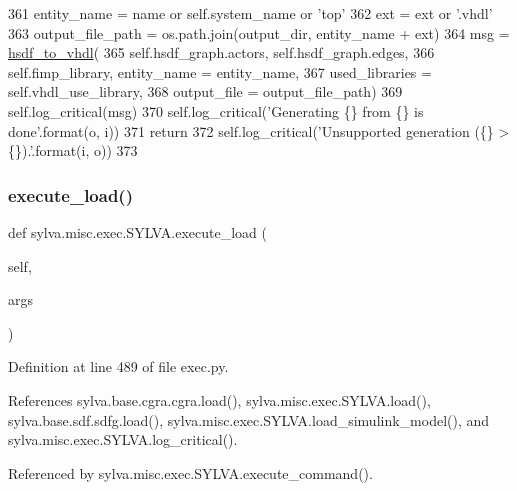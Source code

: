 \begin{DoxyCode}
361       entity\_name = name \textcolor{keywordflow}{or} self.system\_name \textcolor{keywordflow}{or} \textcolor{stringliteral}{'top'}
362       ext = ext \textcolor{keywordflow}{or} \textcolor{stringliteral}{'.vhdl'}
363       output\_file\_path = os.path.join(output\_dir, entity\_name + ext)
364       msg = \hyperlink{namespacesylva_1_1code__generation_1_1hsdf__to__vhdl_a0725288caa57a5c518a1b9c2683291fa}{hsdf\_to\_vhdl}(
365         self.hsdf\_graph.actors, self.hsdf\_graph.edges,
366         self.fimp\_library, entity\_name = entity\_name,
367         used\_libraries = self.vhdl\_use\_library,
368         output\_file = output\_file\_path)
369       self.log\_critical(msg)
370       self.log\_critical(\textcolor{stringliteral}{'Generating \{\} from \{\} is done'}.format(o, i))
371       \textcolor{keywordflow}{return}
372     self.log\_critical(\textcolor{stringliteral}{'Unsupported generation (\{\} > \{\}).'}.format(i, o))
373 
\end{DoxyCode}
\mbox{\label{classsylva_1_1misc_1_1exec_1_1_s_y_l_v_a_ae1fd0355fc0ba1cc2706bc9720347f69}} 
\subsubsection{\texorpdfstring{execute\+\_\+load()}{execute\_load()}}
{\footnotesize\ttfamily def sylva.\+misc.\+exec.\+S\+Y\+L\+V\+A.\+execute\+\_\+load (\begin{DoxyParamCaption}\item[{}]{self,  }\item[{}]{args }\end{DoxyParamCaption})}



Definition at line 489 of file exec.\+py.



References sylva.\+base.\+cgra.\+cgra.\+load(), sylva.\+misc.\+exec.\+S\+Y\+L\+V\+A.\+load(), sylva.\+base.\+sdf.\+sdfg.\+load(), sylva.\+misc.\+exec.\+S\+Y\+L\+V\+A.\+load\+\_\+simulink\+\_\+model(), and sylva.\+misc.\+exec.\+S\+Y\+L\+V\+A.\+log\+\_\+critical().



Referenced by sylva.\+misc.\+exec.\+S\+Y\+L\+V\+A.\+execute\+\_\+command().


